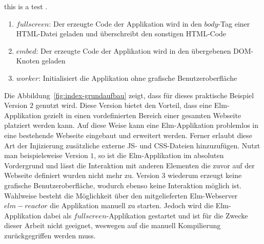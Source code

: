 this is a test \cite{stein1980alternative}.
\begin{enumerate}
\item{$fullscreen$}: Der erzeugte Code der Applikation wird in den $body$-Tag einer \ac{HTML}-Datei geladen und überschreibt den sonstigen \ac{HTML}-Code

\item{$embed$}: Der erzeugte Code der Applikation wird in den übergebenen DOM-Knoten geladen

\item{$worker$}: Initialisiert die Applikation ohne grafische Benutzeroberfläche
\end{enumerate}
Die Abbildung~\ref{fig:index-grundaufbau} zeigt, dass für dieses praktische Beispiel Version $2$ genutzt wird. Diese Version bietet den Vorteil, dass eine Elm-Applikation gezielt in einen vordefinierten Bereich einer gesamten Webseite platziert werden kann. Auf diese Weise kann eine Elm-Applikation problemlos in eine bestehende Webseite eingebaut und erweitert werden. Ferner erlaubt diese Art der Injizierung zusätzliche externe \ac{JS}- und \ac{CSS}-Dateien hinzuzufügen.
Nutzt man beispielsweise Version $1$, so ist die Elm-Applikation im absoluten Vordergrund und lässt die Interaktion mit anderen Elementen die zuvor auf der Webseite definiert wurden nicht mehr zu. Version $3$ wiederum erzeugt keine grafische Benutzeroberfläche, wodurch ebenso keine Interaktion möglich ist.
Wahlweise besteht die Möglichkeit über den mitgelieferten Elm-Webserver $elm-reactor$ die Applikation manuell zu starten. Jedoch wird die Elm-Applikation dabei als $fullscreen$-Applikation gestartet und ist für die Zwecke dieser Arbeit nicht geeignet, weswegen auf die manuell Kompilierung zurückgegriffen werden muss.

